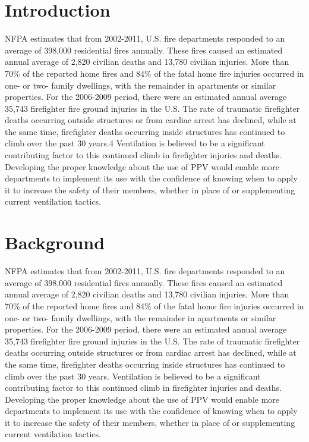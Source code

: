 \documentclass{article}
\begin{document}
\section*{Introduction}
NFPA estimates that from 2002-2011, U.S. fire departments responded to an average of 398,000 residential fires annually. \cite{NFFF} These fires caused an estimated annual average of 2,820 civilian deaths and 13,780 civilian injuries. More than 70\% of the reported home fires and 84\% of the fatal home fire injuries occurred in one- or two- family dwellings, with the remainder in apartments or similar properties. For the 2006-2009 period, there were an estimated annual average 35,743 firefighter fire ground injuries in the U.S. The rate of traumatic firefighter deaths occurring outside structures or from cardiac arrest has declined, while at the same time, firefighter deaths occurring inside structures has continued to climb over the past 30 years.4 Ventilation is believed to be a significant contributing factor to this continued climb in firefighter injuries and deaths.  Developing the proper knowledge about the use of PPV would enable more departments to implement its use with the confidence of knowing when to apply it to increase the safety of their members, whether in place of or supplementing current ventilation tactics.

\section{Background}
NFPA estimates \cite{NFPAFireLoss} that from 2002-2011, U.S. fire departments responded to an average of 398,000 residential fires annually. These fires caused an estimated annual average of 2,820 civilian deaths and 13,780 civilian injuries. More than 70\% of the reported home fires and 84\% of the fatal home fire injuries occurred in one- or two- family dwellings, with the remainder in apartments or similar properties. For the 2006-2009 period, there were an estimated annual average 35,743 firefighter fire ground injuries in the U.S. \cite{NFPAFFInjuries} The rate of traumatic firefighter deaths occurring outside structures or from cardiac arrest has declined, while at the same time, firefighter deaths occurring inside structures has continued to climb over the past 30 years. \cite{NFPALast30} Ventilation is believed to be a significant contributing factor to this continued climb in firefighter injuries and deaths. Developing the proper knowledge about the use of PPV would enable more departments to implement its use with the confidence of knowing when to apply it to increase the safety of their members, whether in place of or supplementing current ventilation tactics.
\end{document}
